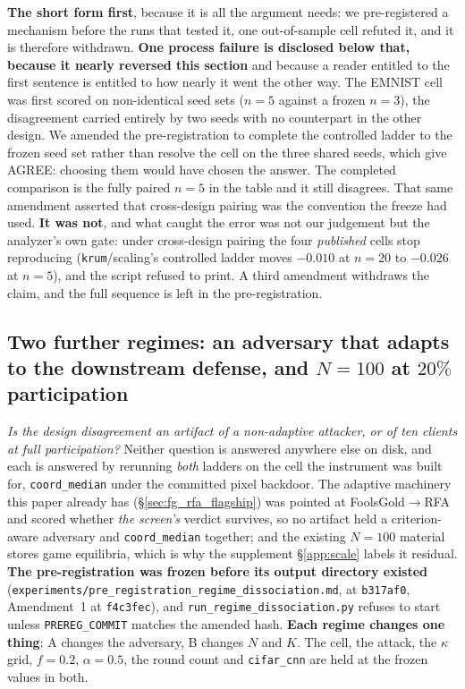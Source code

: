 \documentclass{article}
\begin{document}
\textbf{The short form first}, because it is all the argument needs: we pre-registered a mechanism before the runs that tested it, one out-of-sample cell refuted it, and it is therefore withdrawn. \textbf{One process failure is disclosed below that, because it nearly reversed this section} and because a reader entitled to the first sentence is entitled to how nearly it went the other way. The EMNIST cell was first scored on non-identical seed sets ($n{=}5$ against a frozen $n{=}3$), the disagreement carried entirely by two seeds with no counterpart in the other design. We amended the pre-registration to complete the controlled ladder to the frozen seed set rather than resolve the cell on the three shared seeds, which give AGREE: choosing them would have chosen the answer. The completed comparison is the fully paired $n{=}5$ in the table and it still disagrees. That same amendment asserted that cross-design pairing was the convention the freeze had used. \textbf{It was not}, and what caught the error was not our judgement but the analyzer's own gate: under cross-design pairing the four \emph{published} cells stop reproducing (\texttt{krum}/scaling's controlled ladder moves $-0.010$ at $n{=}20$ to $-0.026$ at $n{=}5$), and the script refused to print. A third amendment withdraws the claim, and the full sequence is left in the pre-registration.


\subsection{Two further regimes: an adversary that adapts to the downstream defense, and $N{=}100$ at $20\%$ participation}
\label{app:regime}

\noindent \emph{Is the design disagreement an artifact of a non-adaptive attacker, or of ten clients at full participation?} Neither question is answered anywhere else on disk, and each is answered by rerunning \emph{both} ladders on the cell the instrument was built for, \texttt{coord\_median} under the committed pixel backdoor. The adaptive machinery this paper already has (§\ref{sec:fg_rfa_flagship}) was pointed at FoolsGold$\to$RFA and scored whether \emph{the screen's} verdict survives, so no artifact held a criterion-aware adversary and \texttt{coord\_median} together; and the existing $N{=}100$ material stores game equilibria, which is why the supplement §\ref{app:scale} labels it residual. \textbf{The pre-registration was frozen before its output directory existed} (\texttt{experiments/pre\_\allowbreak registration\_\allowbreak regime\_\allowbreak dissociation.md}, at \texttt{b317af0}, Amendment~1 at \texttt{f4c3fec}), and \texttt{run\_regime\_dissociation.py} refuses to start unless \texttt{PREREG\_COMMIT} matches the amended hash. \textbf{Each regime changes one thing}: A changes the adversary, B changes $N$ and $K$. The cell, the attack, the $\kappa$ grid, $f{=}0.2$, $\alpha{=}0.5$, the round count and \texttt{cifar\_cnn} are held at the frozen values in both.
\end{document}
